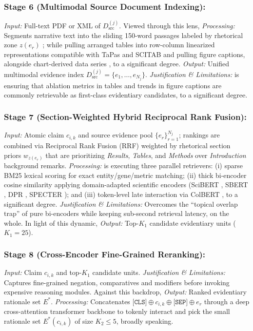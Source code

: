 \documentclass[journal]{IEEEtran}
\begin{document}
\subsubsection{Stage 6 (Multimodal Source Document Indexing):}
\emph{Input:} Full-text PDF or XML of $D_{\text{src}}^{(j)}$. Viewed through this lens, \emph{Processing:} Segments narrative text into the sliding 150-word passages labeled by rhetorical zone $z(e_r)$ \cite{teufel2006automatic}; while pulling arranged tables into row-column linearized representations compatible with TaPas \cite{herzig2020tapas} and SCITAB \cite{lu2023scitab} and pulling figure captions, alongside chart-derived data series \cite{akhtar2023reading}, to a significant degree. \emph{Output:} Unified multimodal evidence index $D_{\text{src}}^{(j)} = \{e_1, \dots, e_{N_j}\}$. \emph{Justification \& Limitations:} is ensuring that ablation metrics in tables and trends in figure captions are commonly retrievable as first-class evidentiary candidates, to a significant degree.

\subsubsection{Stage 7 (Section-Weighted Hybrid Reciprocal Rank Fusion):}
\emph{Input:} Atomic claim $c_{i,k}$ and source evidence pool $\{e_r\}_{r=1}^{N_j}$; rankings are combined via Reciprocal Rank Fusion (RRF) \cite{cormack2009reciprocal} weighted by rhetorical section priors $w_{z(e_r)}$ that are prioritizing \emph{Results}, \emph{Tables}, and \emph{Methods} over \emph{Introduction} background remarks. \emph{Processing:} is executing three parallel retrievers: (i) sparse BM25 lexical scoring \cite{robertson2009probabilistic} for exact entity/gene/metric matching; (ii) thick bi-encoder cosine similarity applying domain-adapted scientific encoders (SciBERT \cite{beltagy2019scibert}, SBERT \cite{reimers2019sentence}, DPR \cite{karpukhin2020dense}, SPECTER \cite{cohan2020specter}); and (iii) token-level late interaction via ColBERT \cite{khattab2020colbert}, to a significant degree. \emph{Justification \& Limitations:} Overcomes the ``topical overlap trap'' of pure bi-encoders while keeping sub-second retrieval latency, on the whole. In light of this dynamic, \emph{Output:} Top-$K_1$ candidate evidentiary units ($K_1 = 25$).

\subsubsection{Stage 8 (Cross-Encoder Fine-Grained Reranking):}
\emph{Input:} Claim $c_{i,k}$ and top-$K_1$ candidate units. \emph{Justification \& Limitations:} Captures fine-grained negation, comparatives and modifiers before invoking expensive reasoning modules. Against this backdrop, \emph{Output:} Ranked evidentiary rationale set $E^*$. \emph{Processing:} Concatenates $\texttt{[CLS]} \oplus c_{i,k} \oplus \texttt{[SEP]} \oplus e_r$ through a deep cross-attention transformer backbone to tokenly interact and pick the small rationale set $E^*(c_{i,k})$ of size $K_2 \leq 5$, broadly speaking.
\end{document}
